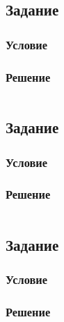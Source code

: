 \documentclass[10pt,a4paper]{article}
\begin{document}
                        
                        
\subsection*{Задание}   
\subsubsection*{Условие}
\subsubsection*{Решение}
\begin{lstlisting}
\end{lstlisting}

\subsection*{Задание}   
\subsubsection*{Условие}
\subsubsection*{Решение}
\begin{lstlisting}
\end{lstlisting}

\subsection*{Задание}   
\subsubsection*{Условие}
\subsubsection*{Решение}
\begin{lstlisting}
\end{lstlisting}
\end{document}
